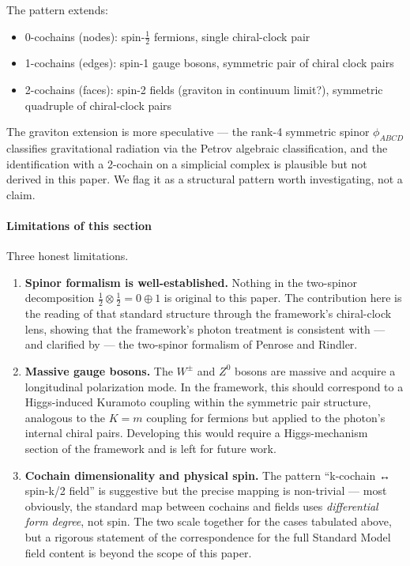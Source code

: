 \documentclass[
]{article}
\providecommand{\tightlist}{%
  \setlength{\itemsep}{0pt}\setlength{\parskip}{0pt}}
\begin{document}
The pattern extends:

\begin{itemize}
\tightlist
\item
  0-cochains (nodes): spin-\(\tfrac{1}{2}\) fermions, single
  chiral-clock pair
\item
  1-cochains (edges): spin-1 gauge bosons, symmetric pair of chiral
  clock pairs
\item
  2-cochains (faces): spin-2 fields (graviton in continuum limit?),
  symmetric quadruple of chiral-clock pairs
\end{itemize}

The graviton extension is more speculative --- the rank-4 symmetric
spinor \(\phi_{ABCD}\) classifies gravitational radiation via the Petrov
algebraic classification, and the identification with a 2-cochain on a
simplicial complex is plausible but not derived in this paper. We flag
it as a structural pattern worth investigating, not a claim.

\paragraph{Limitations of this
section}\label{limitations-of-this-section}

Three honest limitations.

\begin{enumerate}
\def\labelenumi{\arabic{enumi}.}
\item
  \textbf{Spinor formalism is well-established.} Nothing in the
  two-spinor decomposition
  \(\tfrac{1}{2} \otimes \tfrac{1}{2} = 0 \oplus 1\) is original to this
  paper. The contribution here is the reading of that standard structure
  through the framework's chiral-clock lens, showing that the
  framework's photon treatment is consistent with --- and clarified by
  --- the two-spinor formalism of Penrose and Rindler.
\item
  \textbf{Massive gauge bosons.} The \(W^\pm\) and \(Z^0\) bosons are
  massive and acquire a longitudinal polarization mode. In the
  framework, this should correspond to a Higgs-induced Kuramoto coupling
  within the symmetric pair structure, analogous to the \(K = m\)
  coupling for fermions but applied to the photon's internal chiral
  pairs. Developing this would require a Higgs-mechanism section of the
  framework and is left for future work.
\item
  \textbf{Cochain dimensionality and physical spin.} The pattern
  ``k-cochain ↔ spin-k/2 field'' is suggestive but the precise mapping
  is non-trivial --- most obviously, the standard map between cochains
  and fields uses \emph{differential form degree}, not spin. The two
  scale together for the cases tabulated above, but a rigorous statement
  of the correspondence for the full Standard Model field content is
  beyond the scope of this paper.
\end{enumerate}
\end{document}

